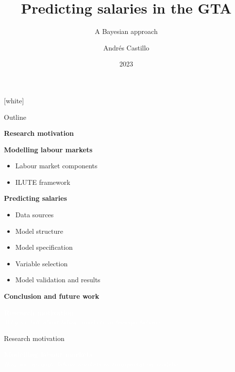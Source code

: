 \documentclass[aspectratio=169]{beamer}
\title{Predicting salaries in the GTA}
\subtitle{A Bayesian approach}
\author{Andrés Castillo}
\institute{University of Toronto}
\date{2023}
\begin{document}
{
[white]
\begin{frame}
  \titlepage
\end{frame}
}

\begin{frame}{Outline}
    \begin{enumerate}
        {\normalsize
            \item \textbf{Research motivation}
            \item \textbf{Modelling labour markets}
            \begin{itemize}
                \item Labour market components
                \item ILUTE framework
            \end{itemize}
            \item \textbf{Predicting salaries}
            \begin{itemize}
                \item Data sources
                \item Model structure
                \item Model specification
                \item Variable selection
                \item Model validation and results
            \end{itemize}
            \item \textbf{Conclusion and future work}
        }
    \end{enumerate}
\end{frame}

{
\begin{frame}
    \begin{center}
        \textcolor{white}{{\fontsize{22pt}{14pt}\selectfont \textbf{Research motivation}}}\\
        \vspace{20pt}
        \textcolor{white}{{\fontsize{14pt}{10pt}\selectfont \textsl{Why we talk about labour markets in transportation?}}}
    \end{center}
\end{frame}
}

\begin{frame}{Research motivation}
\end{frame}

{
\begin{frame}
    \begin{center}
        \textcolor{white}{{\fontsize{22pt}{14pt}\selectfont \textbf{Modelling labour markets}}}\\
        \vspace{20pt}
        \textcolor{white}{{\fontsize{14pt}{10pt}\selectfont \textsl{How we integrate labour markets in transportation models?}}}
    \end{center}
\end{frame}
}
\end{document}
